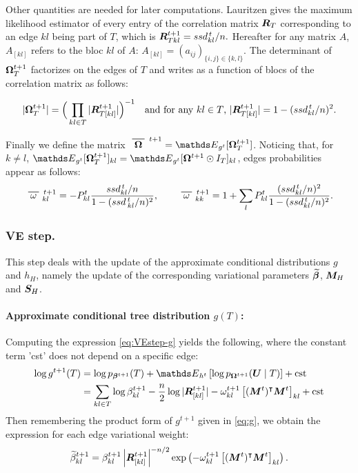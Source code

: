 Other quantities are needed for later computations. Lauritzen  gives the maximum likelihood estimator of every entry of the correlation matrix ${\boldsymbol{R}}_T$ corresponding to an edge $kl$ being part of $T$, which is
$ {\boldsymbol{R}}_{Tkl}^{t+1} = ssd_{kl}^{\,t}/n. $
Hereafter for any matrix $A$, $A_{[kl]}$ refers to the bloc $kl$ of $A$: $A_{[kl]}=(a_{ij})_{\{i,j\}\in\{k,l\}}$. The determinant of ${\boldsymbol{\Omega}}^{t+1}_T$ factorizes on the edges of $T$ and writes as a function of blocs of the correlation matrix  as follows:  

\begin{align}
    |{\boldsymbol{\Omega}}^{t+1}_{T}| = \Big(\prod_{kl \in T} |{\boldsymbol{R}}_{T[kl]}^{t+1}|\Big)^{-1}
\quad 
\text{and for any $kl \in T$, } 
|{\boldsymbol{R}}_{T[kl]}^{t+1}|= 1-(ssd_{kl}^{\,t}/n)^2. \label{RT}
\end{align}

 
Finally we define the matrix  $\xbar{\Omegabf}^{\,t+1} = \Esp_{g^t}[\Omegabf^{t+1}_T]$. 
Noticing that, for $k \neq l$, $\Esp_{g^t}[\Omegabf^{t+1}_T]_{kl} = \Esp_{g^t}[\Omegabf^{t+1} \odot I_T]_{kl}$, edges probabilities appear as follows:
$$
\xbar{\omega}_{kl}^{\,t+1} 
= - P_{kl}^t\dfrac{ ssd_{kl}^{\,t}/n}{1-(ssd\,^t_{kl}/n)^2}, 
\qquad 
\xbar{\omega}_{kk}^{\,t+1}= 1+\sum_l P_{kl}^t \dfrac{(ssd_{kl}^{\,t}/n)^2}{1-(ssd_{kl}^{\,t}/n)^2}.
$$

 
\subsubsection*{VE step.} 
This step deals with the update of the approximate conditional distributions $g$ and $h_H$, namely the update of the corresponding variational parameters ${\widetilde{{\boldsymbol{\beta}}}}$, ${\boldsymbol{M}}_H$ and ${\boldsymbol{S}}_H$.

\paragraph{Approximate conditional tree distribution $g(T)$:}
Computing the expression \eqref{eq:VEstep-g} yields the following, where the constant term 'cst' does not depend on a specific edge:
\begin{align*}
 \log g^{t+1}(T) &= \log p_{\betabf^{t+1}}(T) + \Esp_{h^t} \left[ \log p_{\Omegabf^{t+1}}(\Ubf \mid T) \right]  + \text{cst}  \\
&=  \sum_{kl \in T} \log \beta^{t+1}_{kl} 
- \frac{n}2 \log |\Rbf_{[kl]}^{t+1} | 
-  \omega^{t+1}_{kl} \left[(\Mbf^t)^\intercal \Mbf^t\right]_{kl} + \text{cst}
\end{align*}
  Then remembering the product form of  $g^{t+1}$ given in \eqref{eq:g}, we obtain the expression for each edge variational weight:
  \begin{equation}\label{update:beta}
      {\widetilde{\beta}}^{t+1}_{kl} = \beta^{t+1}_{kl} \left|{\boldsymbol{R}}_{[kl]}^{t+1}\right|^{-n/2} \exp\left(-\omega^{t+1}_{kl} \left[({\boldsymbol{M}}^t)^\intercal {\boldsymbol{M}}^t\right]_{kl}\right).
  \end{equation}
 

